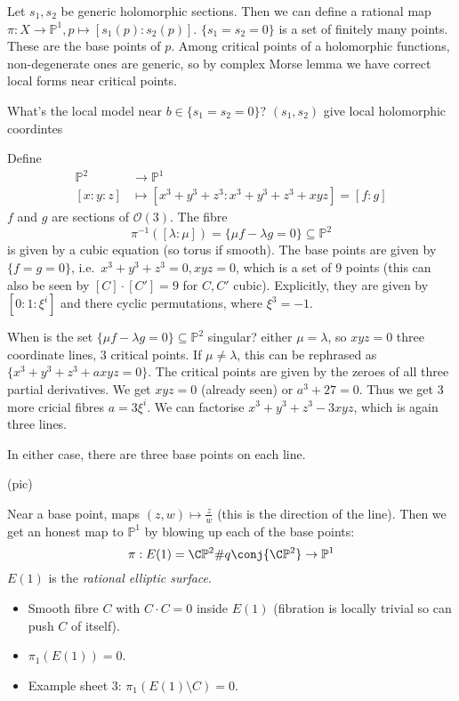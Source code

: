 \documentclass[a4paper]{article}
\renewcommand*{\P}{\mathbb{P}}
\begin{document}
Let \(s_1, s_2\) be generic holomorphic sections. Then we can define a rational map \(\pi: X \to \P^1, p \mapsto [s_1(p): s_2(p)]\). \(\{s_1 = s_2 = 0\}\) is a set of finitely many points. These are the base points of \(p\). Among critical points of a holomorphic functions, non-degenerate ones are generic, so by complex Morse lemma we have correct local forms near critical points.

What's the local model near \(b \in \{s_1 = s_2 = 0\}\)? \((s_1, s_2)\) give local holomorphic coordintes

\begin{eg}[pencil of cubics in \(\P^2\)]
  Define
  \begin{align*}
    \P^2 &\to \P^1 \\
    [x: y: z] &\mapsto [x^3 + y^3 + z^3: x^3 + y^3 + z^3 + xyz] = [f: g]
  \end{align*}
  \(f\) and \(g\) are sections of \(\mathcal O(3)\). The fibre
  \[
    \pi^{-1}([\lambda: \mu]) = \{\mu f - \lambda g = 0\} \subseteq \P^2
  \]
  is given by a cubic equation (so torus if smooth). The base points are given by \(\{f = g = 0\}\), i.e.\ \(x^3 + y^3 + z^3 = 0, xyz = 0\), which is a set of 9 points (this can also be seen by \([C] \cdot [C'] = 9\) for \(C, C'\) cubic). Explicitly, they are given by \([0: 1: \xi^i]\) and there cyclic permutations, where \(\xi^3 = -1\).

  When is the set \(\{\mu f - \lambda g = 0\} \subseteq \P^2\) singular? either \(\mu = \lambda\), so \(xyz = 0\) three coordinate lines, 3 critical points. If \(\mu \ne \lambda\), this can be rephrased as \(\{x^3 + y^3 + z^3 + axyz = 0\}\). The critical points are given by the zeroes of all three partial derivatives. We get \(xyz = 0\) (already seen) or \(a^3 + 27 = 0\). Thus we get 3 more cricial fibres \(a = 3 \xi^i\). We can factorise \(x^3 + y^3 + z^3 - 3xyz\), which is again three lines.

  In either case, there are three base points on each line.

  (pic)

  Near a base point, maps \((z, w) \mapsto \frac{z}{w}\) (this is the direction of the line). Then we get an honest map to \(\P^1\) by blowing up each of the base points:
  \[
    \pi: E(1) = \C\P^2 \# q \conj{\C\P^2} \to \P^1
  \]
  \(E(1)\) is the \emph{rational elliptic surface}.
  \begin{itemize}
  \item Smooth fibre \(C\) with \(C \cdot C = 0\) inside \(E(1)\) (fibration is locally trivial so can push \(C\) of itself).
  \item \(\pi_1(E(1)) = 0\).
  \item Example sheet 3: \(\pi_1(E(1) \setminus C) = 0\).
  \end{itemize}
\end{eg}
\end{document}
